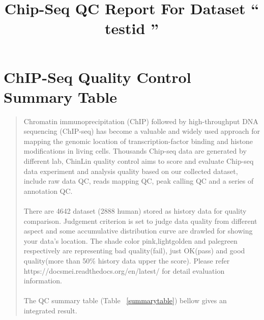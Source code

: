 \documentclass[11pt,a4paper]{article}
\begin{document}
\title{Chip-Seq QC Report For Dataset `` testid ''}

\vspace{-1cm}
\maketitle
\tableofcontents
\setcounter{tocdepth}{2}
\newpage
\section{ChIP-Seq Quality Control Summary Table}
\begin{quotation}
Chromatin immunoprecipitation (ChIP) followed by high-throughput DNA sequencing (ChIP-seq) has become a valuable and widely used approach for mapping the genomic location of transcription-factor binding and histone modifications in living cells. Thousands Chip-seq data are generated by different lab, ChinLin quality control aims to  score and evaluate Chip-seq data experiment and analysis quality based on our collected dataset, include raw data QC, reads mapping QC, peak calling QC and a series of annotation QC.\\ \\
There are 4642 dataset (2888 human) stored as history data for quality comparison. Judgement criterion is set to judge data quality from different aspect and some accumulative distribution curve are drawled for showing your data's location. The shade color pink,lightgolden and palegreen respectively are representing bad quality(fail), just OK(pass) and good quality(more than 50\% history data upper the score). Please refer https://docsmei.readthedocs.org/en/latest/ for  detail evaluation information. \\\\
The QC summary table (Table ~\ref{summarytable}) bellow gives an integrated result.
\end{quotation} 
\newpage
\end{document}
